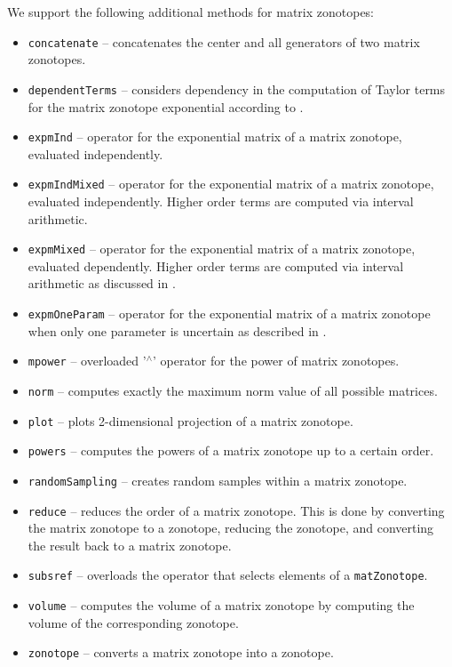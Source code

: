 We support the following additional methods for matrix zonotopes:

\begin{itemize}
 \item \texttt{concatenate} -- concatenates the center and all generators of two matrix zonotopes.
 \item \texttt{dependentTerms} -- considers dependency in the computation of Taylor terms for the matrix zonotope exponential according to \cite[Proposition 4.3]{Althoff2011b}. 
 \item \texttt{expmInd} -- operator for the exponential matrix of a matrix zonotope, evaluated independently.
 \item \texttt{expmIndMixed} -- operator for the exponential matrix of a matrix zonotope, evaluated independently. Higher order terms are computed via interval arithmetic.
 \item \texttt{expmMixed} -- operator for the exponential matrix of a matrix zonotope, evaluated dependently. Higher order terms are computed
via interval arithmetic as discussed in \cite[Section 4.4.4]{Althoff2011b}.
 \item \texttt{expmOneParam} -- operator for the exponential matrix of a matrix zonotope when only one parameter is uncertain as described in \cite[Theorem 1]{Althoff2012b}.
 \item \texttt{mpower} -- overloaded '${}^{\wedge}$' operator for the power of matrix zonotopes.
 \item \texttt{norm} -- computes exactly the maximum norm value of all possible matrices.
 \item \texttt{plot} -- plots 2-dimensional projection of a matrix zonotope.
 \item \texttt{powers} -- computes the powers of a matrix zonotope up to a certain order.
 \item \texttt{randomSampling} -- creates random samples within a matrix zonotope.
 \item \texttt{reduce} -- reduces the order of a matrix zonotope. This is done by converting the matrix zonotope to a zonotope, reducing the zonotope, and converting the result back to a matrix zonotope.
 \item \texttt{subsref} -- overloads the operator that selects elements of a \texttt{matZonotope}.
 \item \texttt{volume} -- computes the volume of a matrix zonotope by computing the volume
of the corresponding zonotope.
 \item \texttt{zonotope} -- converts a matrix zonotope into a zonotope.
\end{itemize}


